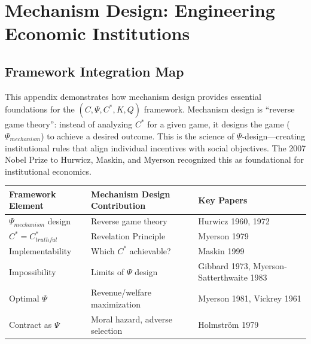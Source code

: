 \section{Mechanism Design: Engineering Economic Institutions}
\label{app:mechanism-design}

\subsection{Framework Integration Map}

This appendix demonstrates how mechanism design provides essential foundations 
for the $(C, \Psi, C^*, K, Q)$ framework. Mechanism design is ``reverse game 
theory'': instead of analyzing $C^*$ for a given game, it designs the game 
($\Psi_{mechanism}$) to achieve a desired outcome. This is the science of 
$\Psi$-design---creating institutional rules that align individual incentives 
with social objectives. The 2007 Nobel Prize to Hurwicz, Maskin, and Myerson 
recognized this as foundational for institutional economics.

\begin{center}
\renewcommand{\arraystretch}{1.4}
\begin{tabular}{|l|l|l|}
\hline
\textbf{Framework Element} & \textbf{Mechanism Design Contribution} & \textbf{Key Papers} \\
\hline
$\Psi_{mechanism}$ design & Reverse game theory & Hurwicz 1960, 1972 \\
$C^* = C^*_{truthful}$ & Revelation Principle & Myerson 1979 \\
Implementability & Which $C^*$ achievable? & Maskin 1999 \\
Impossibility & Limits of $\Psi$ design & Gibbard 1973, Myerson-Satterthwaite 1983 \\
Optimal $\Psi$ & Revenue/welfare maximization & Myerson 1981, Vickrey 1961 \\
Contract as $\Psi$ & Moral hazard, adverse selection & Holmström 1979 \\
\hline
\end{tabular}
\end{center}


